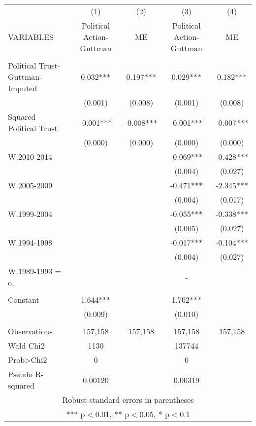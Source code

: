 \documentclass[]{article}
\begin{document}
\begin{tabular}{lcccc} \hline
 & (1) & (2) & (3) & (4) \\
VARIABLES & Political Action-Guttman & ME & Political Action-Guttman & ME \\ \hline
 &  &  &  &  \\
Political Trust-Guttman-Imputed & 0.032*** & 0.197*** & 0.029*** & 0.182*** \\
 & (0.001) & (0.008) & (0.001) & (0.008) \\
Squared Political Trust & -0.001*** & -0.008*** & -0.001*** & -0.007*** \\
 & (0.000) & (0.000) & (0.000) & (0.000) \\
W.2010-2014 &  &  & -0.069*** & -0.428*** \\
 &  &  & (0.004) & (0.027) \\
W.2005-2009 &  &  & -0.471*** & -2.345*** \\
 &  &  & (0.004) & (0.017) \\
W.1999-2004 &  &  & -0.055*** & -0.338*** \\
 &  &  & (0.005) & (0.027) \\
W.1994-1998 &  &  & -0.017*** & -0.104*** \\
 &  &  & (0.004) & (0.027) \\
W.1989-1993 = o, &  &  & - &  \\
 &  &  &  &  \\
Constant & 1.644*** &  & 1.702*** &  \\
 & (0.009) &  & (0.010) &  \\
 &  &  &  &  \\
Observations & 157,158 & 157,158 & 157,158 & 157,158 \\
Wald Chi2 & 1130 &  & 137744 &  \\
Prob>Chi2 & 0 &  & 0 &  \\
 Pseudo R-squared & 0.00120 &  & 0.00319 &  \\ \hline
\multicolumn{5}{c}{ Robust standard errors in parentheses} \\
\multicolumn{5}{c}{ *** p$<$0.01, ** p$<$0.05, * p$<$0.1} \\
\end{tabular}
\end{document}

